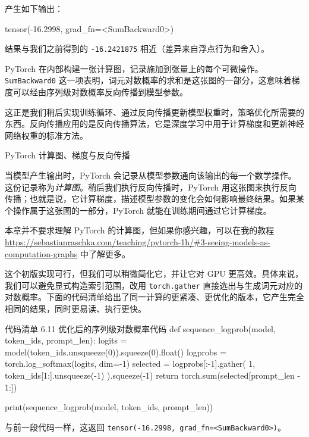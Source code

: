 产生如下输出：

\begin{codebox}
tensor(-16.2998, grad_fn=<SumBackward0>)
\end{codebox}

结果与我们之前得到的 \texttt{-16.2421875} 相近（差异来自浮点行为和舍入）。

PyTorch 在内部构建一张计算图，记录施加到张量上的每个可微操作。\texttt{SumBackward0} 这一项表明，词元对数概率的求和是这张图的一部分，这意味着梯度可以经由序列级对数概率反向传播到模型参数。

这正是我们稍后实现训练循环、通过反向传播更新模型权重时，策略优化所需要的东西。反向传播应用的是反向传播算法，它是深度学习中用于计算梯度和更新神经网络权重的标准方法。

\begin{mySidebar}{PyTorch 计算图、梯度与反向传播}

当模型产生输出时，PyTorch 会记录从模型参数通向该输出的每一个数学操作。这份记录称为\emph{计算图}。稍后我们执行反向传播时，PyTorch 用这张图来执行反向传播；也就是说，它计算梯度，描述模型参数的变化会如何影响最终结果。如果某个操作属于这张图的一部分，PyTorch 就能在训练期间通过它计算梯度。

本章并不要求理解 PyTorch 的计算图，但如果你感兴趣，可以在我的教程 \href{https://sebastianraschka.com/teaching/pytorch-1h/\#3-seeing-models-as-computation-graphs}{https://sebastianraschka.com/teaching/pytorch-1h/\#3-seeing-models-as-computation-graphs} 中了解更多。

\end{mySidebar}

这个初版实现可行，但我们可以稍微简化它，并让它对 GPU 更高效。具体来说，我们可以避免显式构造索引范围，改用 \texttt{torch.gather} 直接选出与生成词元对应的对数概率。下面的代码清单给出了同一计算的更紧凑、更优化的版本，它产生完全相同的结果，同时更易读、执行更快。

\begin{codeboxt}{代码清单 6.11 优化后的序列级对数概率代码}
def sequence_logprob(model, token_ids, prompt_len):
    logits = model(token_ids.unsqueeze(0)).squeeze(0).float()
    logprobs = torch.log_softmax(logits, dim=-1)
    selected = logprobs[:-1].gather(
        1, token_ids[1:].unsqueeze(-1)
    ).squeeze(-1)
    return torch.sum(selected[prompt_len - 1:])

print(sequence_logprob(model, token_ids, prompt_len))
\end{codeboxt}

与前一段代码一样，这返回 \texttt{tensor(-16.2998, grad\_fn=\textless{}SumBackward0\textgreater{})}。

